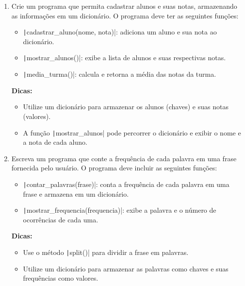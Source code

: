 \documentclass[12pt]{article}
\begin{document}
\begin{enumerate}
    \newpage

  \item Crie um programa que permita cadastrar alunos e suas notas, armazenando as informações em um dicionário. O programa deve ter as seguintes funções:
    \begin{itemize}
      \item \texttt|cadastrar_aluno(nome, nota)|: adiciona um aluno e sua nota ao dicionário.
      \item \texttt|mostrar_alunos()|: exibe a lista de alunos e suas respectivas notas.
      \item \texttt|media_turma()|: calcula e retorna a média das notas da turma.
    \end{itemize}
    \textbf{Dicas:}
    \begin{itemize}
      \item Utilize um dicionário para armazenar os alunos (chaves) e suas notas (valores).
      \item A função \texttt|mostrar_alunos| pode percorrer o dicionário e exibir o nome e a nota de cada aluno.
    \end{itemize}

  \item Escreva um programa que conte a frequência de cada palavra em uma frase fornecida pelo usuário. O programa deve incluir as seguintes funções:
    \begin{itemize}
      \item \texttt|contar_palavras(frase)|: conta a frequência de cada palavra em uma frase e armazena em um dicionário.
      \item \texttt|mostrar_frequencia(frequencia)|: exibe a palavra e o número de ocorrências de cada uma.
    \end{itemize}
    \textbf{Dicas:}
    \begin{itemize}
      \item Use o método \texttt|split()| para dividir a frase em palavras.
      \item Utilize um dicionário para armazenar as palavras como chaves e suas frequências como valores.
    \end{itemize}


\end{enumerate}
\end{document}
